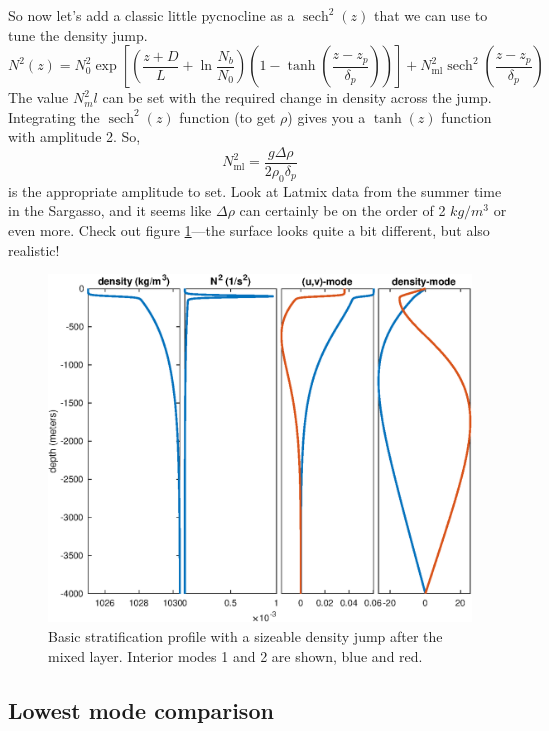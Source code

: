 \documentclass{article}
\DeclareMathOperator{\sech}{sech}
\begin{document}
So now let's add a classic little pycnocline as a $\sech^2(z)$ that we can use to tune the density jump.
\begin{equation}
    N^2(z) = N_0^2 \exp \left[ \left( \frac{z+D}{L} + \ln \frac{N_b}{N_0} \right)\left( 1-\tanh\left(\frac{z-z_p}{\delta_p}\right) \right) \right] + N_\textrm{ml}^2 \sech^2 \left(\frac{z-z_p}{\delta_p}\right)
\end{equation}{}
The value $N^2_ml$ can be set with the required change in density across the jump. Integrating the $\sech^2(z)$ function (to get $\rho$) gives you a $\tanh(z)$ function with amplitude 2. So,
\begin{equation}
    N_\textrm{ml}^2 = \frac{g \Delta \rho }{2 \rho_0 \delta_p}
\end{equation}{}
is the appropriate amplitude to set. Look at Latmix data from the summer time in the Sargasso, and it seems like $\Delta \rho$ can certainly be on the order of 2 $kg/m^3$ or even more. Check out figure \ref{modes-3-deltarho}---the surface looks quite a bit different, but also realistic!
\begin{figure}
\vspace{-30pt}
    \includegraphics[width=1.0\textwidth]{ModesWithDeltaRho3}
  \caption{Basic stratification profile with a sizeable density jump after the mixed layer. Interior modes 1 and 2 are shown, blue and red.}
  \label{modes-3-deltarho}
\end{figure}

%
\subsection{Lowest mode comparison}
%
\end{document}
